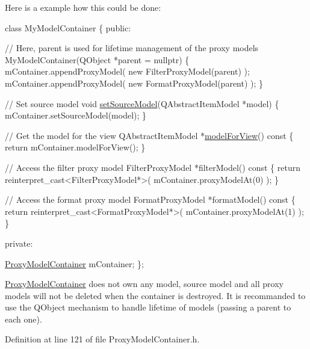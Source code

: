 Here is a example how this could be done\+: 
\begin{DoxyCode}
\textcolor{keyword}{class }MyModelContainer
\{
 \textcolor{keyword}{public}:

  \textcolor{comment}{// Here, parent is used for lifetime management of the proxy models}
  MyModelContainer(QObject *parent = \textcolor{keyword}{nullptr})
  \{
    mContainer.appendProxyModel( \textcolor{keyword}{new} FilterProxyModel(parent) );
    mContainer.appendProxyModel( \textcolor{keyword}{new} FormatProxyModel(parent) );
  \}

  \textcolor{comment}{// Set source model}
  \textcolor{keywordtype}{void} \hyperlink{class_mdt_1_1_item_model_1_1_proxy_model_container_a74f1afaa5c2002a6c0f7d31caed4fb2e}{setSourceModel}(QAbstractItemModel *model)
  \{
    mContainer.setSourceModel(model);
  \}

  \textcolor{comment}{// Get the model for the view}
  QAbstractItemModel *\hyperlink{class_mdt_1_1_item_model_1_1_proxy_model_container_ad7f8e95b0603b354a80bf4514db5a6e1}{modelForView}()\textcolor{keyword}{ const}
\textcolor{keyword}{  }\{
    \textcolor{keywordflow}{return} mContainer.modelForView();
  \}

  \textcolor{comment}{// Access the filter proxy model}
  FilterProxyModel *filterModel()\textcolor{keyword}{ const}
\textcolor{keyword}{  }\{
    \textcolor{keywordflow}{return} \textcolor{keyword}{reinterpret\_cast<}FilterProxyModel*\textcolor{keyword}{>}( mContainer.proxyModelAt(0) );
  \}

  \textcolor{comment}{// Access the format proxy model}
  FormatProxyModel *formatModel()\textcolor{keyword}{ const}
\textcolor{keyword}{  }\{
    \textcolor{keywordflow}{return} \textcolor{keyword}{reinterpret\_cast<}FormatProxyModel*\textcolor{keyword}{>}( mContainer.proxyModelAt(1) );
  \}

 \textcolor{keyword}{private}:

  \hyperlink{class_mdt_1_1_item_model_1_1_proxy_model_container_acef8f95b42382752a454b607bcf6d9b0}{ProxyModelContainer} mContainer;
\};
\end{DoxyCode}


\hyperlink{class_mdt_1_1_item_model_1_1_proxy_model_container}{Proxy\+Model\+Container} does not own any model, source model and all proxy models will not be deleted when the container is destroyed. It is recommanded to use the Q\+Object mechanism to handle lifetime of models (passing a parent to each one). 

Definition at line 121 of file Proxy\+Model\+Container.\+h.



